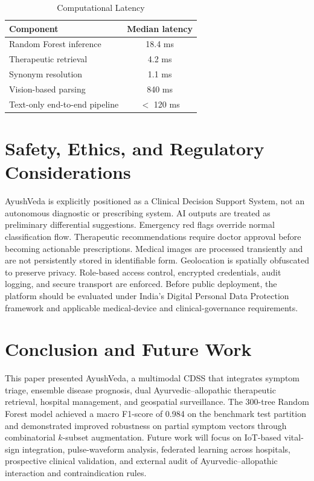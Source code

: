 \documentclass[conference]{IEEEtran}
\begin{document}
\begin{table}[htbp]
\caption{Computational Latency}
\label{tab:latency}
\centering
\begin{tabular}{lc}
\toprule
\textbf{Component} & \textbf{Median latency} \\
\midrule
Random Forest inference & 18.4 ms \\
Therapeutic retrieval & 4.2 ms \\
Synonym resolution & 1.1 ms \\
Vision-based parsing & 840 ms \\
Text-only end-to-end pipeline & $<$ 120 ms \\
\bottomrule
\end{tabular}
\end{table}

\section{Safety, Ethics, and Regulatory Considerations}
AyushVeda is explicitly positioned as a Clinical Decision Support System, not an autonomous diagnostic or prescribing system. AI outputs are treated as preliminary differential suggestions. Emergency red flags override normal classification flow. Therapeutic recommendations require doctor approval before becoming actionable prescriptions. Medical images are processed transiently and are not persistently stored in identifiable form. Geolocation is spatially obfuscated to preserve privacy. Role-based access control, encrypted credentials, audit logging, and secure transport are enforced. Before public deployment, the platform should be evaluated under India's Digital Personal Data Protection framework and applicable medical-device and clinical-governance requirements.

\section{Conclusion and Future Work}
This paper presented AyushVeda, a multimodal CDSS that integrates symptom triage, ensemble disease prognosis, dual Ayurvedic--allopathic therapeutic retrieval, hospital management, and geospatial surveillance. The 300-tree Random Forest model achieved a macro F1-score of 0.984 on the benchmark test partition and demonstrated improved robustness on partial symptom vectors through combinatorial $k$-subset augmentation. Future work will focus on IoT-based vital-sign integration, pulse-waveform analysis, federated learning across hospitals, prospective clinical validation, and external audit of Ayurvedic--allopathic interaction and contraindication rules.
\end{document}
